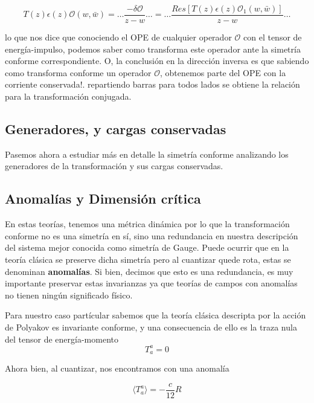 \documentclass[]{article}
\begin{document}
\begin{equation}\label{piola1}
T(z)\epsilon(z)\mathcal{O}(w,\bar{w})=\dots \frac{-\delta \mathcal{O}}{z-w} \dots=\dots \frac{Res\left[T(z)\epsilon(z)\mathcal{O}_1(w,\bar{w})\right]}{z-w} \dots
\end{equation}

\noindent lo que nos dice que conociendo el OPE de cualquier operador $ \mathcal{O} $ con el tensor de energía-impulso, podemos saber como transforma este operador ante la simetría conforme correspondiente. O, la conclusión en la dirección inversa es que sabiendo como transforma conforme un operador $ \mathcal{O} $, obtenemos parte del OPE con la corriente conservada!. repartiendo barras para todos lados se obtiene la relación para la transformación conjugada.

\subsection*{Generadores, y cargas conservadas}

Pasemos ahora a estudiar más en detalle la simetría conforme analizando los generadores de la transformación y sus cargas conservadas.

\subsection*{Anomalías y Dimensión crítica}

En estas teorías, tenemos una métrica dinámica por lo que la transformación conforme no es una simetría en sí, sino una redundancia en nuestra descripción del sistema mejor conocida como simetría de Gauge. Puede ocurrir que en la teoría clásica se preserve dicha simetría pero al cuantizar quede rota, estas se denominan \textbf{anomalías}. Si bien, decimos que esto es una redundancia, es muy importante preservar estas invarianzas ya que teorías de campos con anomalías no tienen ningún significado físico.

Para nuestro caso partícular sabemos que la teoría clásica descripta por la acción de Polyakov es invariante conforme, y una consecuencia de ello es la traza nula del tensor de energía-momento 
\begin{equation}\label{traza}
T_a^a=0
\end{equation}

Ahora bien, al cuantizar, nos encontramos con una anomalía

\begin{equation}\label{key}
\langle T_a^a\rangle=-\frac{c}{12}R
\end{equation}
\end{document}
